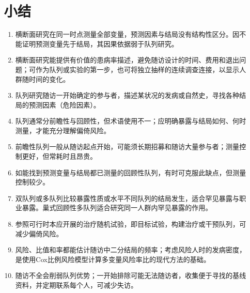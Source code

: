 \section{小结}
\begin{enumerate}
\item 横断面研究在同一时点测量全部变量，预测因素与结局没有结构性区分。因不能证明预测变量先于结局，其因果依据弱于队列研究。
\item 横断面研究能提供有价值的患病率描述，避免随访设计的时间、费用和退出问题；可作为队列或实验的第一步，也可将独立抽样的连续调查连接，以显示人群随时间的变化。
\item 队列研究随访一开始确定的参与者，描述某状况的发病或自然史，寻找各种结局的预测因素（危险因素）。
\item 队列通常分前瞻性与回顾性，但术语使用不一；应明确暴露与结局如何、何时测量，才能充分理解偏倚风险。
\item 前瞻性队列一般从随访起点开始，可能须长期招募和随访大量参与者；测量控制更好，但常耗时且昂贵。
\item 如能找到预测变量与结局都已测量的回顾性队列，有时可克服此缺点，但测量控制较少。
\item 双队列或多队列比较暴露性质或水平不同队列的结局发生，适合罕见暴露与职业暴露。巢式回顾性多队列适合研究同一人群内罕见暴露的作用。
\item 参照可行时本应开展的治疗随机试验，即目标试验，构建治疗或干预队列，可减少偏倚风险。
\item 风险、比值和率都能估计随访中二分结局的频率；考虑风险人时的发病密度，是使用Cox比例风险模型计算多变量风险率比的现代方法的基础。
\item 随访不全会削弱队列优势；一开始排除可能无法随访者，收集便于寻找的基线资料，并定期联系每个人，可减少失访。
\end{enumerate}

